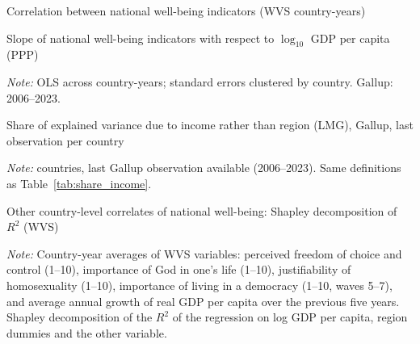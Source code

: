 \renewcommand{\thetable}{A\arabic{table}}
\renewcommand{\thefigure}{A\arabic{figure}}
\setcounter{table}{0}
\setcounter{figure}{0}

\begin{table}[htbp]
    \centering
    \caption{Correlation between national well-being indicators (WVS country-years)}\label{tab:correlation}
    \begin{adjustbox}{max width=\textwidth}
    
    \end{adjustbox}
\end{table}

\begin{table}[htbp]
    \centering
    \caption{Slope of national well-being indicators with respect to $\log_{10}$ GDP per capita (PPP)}\label{tab:slopes}
    \begin{adjustbox}{max width=\textwidth}
    
    \end{adjustbox}
    \begin{minipage}{\textwidth}\footnotesize \textit{Note:} OLS across country-years; standard errors clustered by country. Gallup: 2006--2023.\end{minipage}
\end{table}

\begin{table}[htbp]
    \centering
    \caption{Share of explained variance due to income rather than region (LMG), Gallup, last observation per country}\label{tab:share_gallup}
    \begin{adjustbox}{max width=\textwidth}
    
    \end{adjustbox}
    \begin{minipage}{\textwidth}\footnotesize \textit{Note:} \nGallupCountries countries, last Gallup observation available (2006--2023). Same definitions as Table~\ref{tab:share_income}.\end{minipage}
\end{table}

\begin{table}[htbp]
    \centering
    \caption{Other country-level correlates of national well-being: Shapley decomposition of $R^2$ (WVS)}\label{tab:correlates}
    \begin{adjustbox}{max width=\textwidth}
    
    \end{adjustbox}
    \begin{minipage}{\textwidth}\footnotesize \textit{Note:} Country-year averages of WVS variables: perceived freedom of choice and control (1--10), importance of God in one's life (1--10), justifiability of homosexuality (1--10), importance of living in a democracy (1--10, waves 5--7), and average annual growth of real GDP per capita over the previous five years. Shapley decomposition of the $R^2$ of the regression on log GDP per capita, region dummies and the other variable.\end{minipage}
\end{table}

